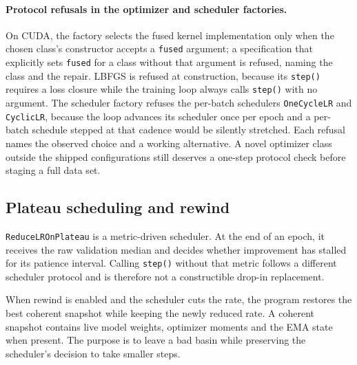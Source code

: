\documentclass[10pt,aps,prd,twocolumn,nofootinbib]{revtex4-2}
\newcommand{\code}[1]{\texttt{#1}}
\begin{document}
\paragraph{Protocol refusals in the optimizer and scheduler factories.}
On CUDA, the factory selects the fused kernel implementation only when the
chosen class's constructor accepts a \code{fused} argument; a specification
that explicitly sets \code{fused} for a class without that argument is
refused, naming the class and the repair.  LBFGS is refused at
construction, because its \code{step()} requires a loss closure while the
training loop always calls \code{step()} with no argument.  The scheduler
factory refuses the per-batch schedulers \code{OneCycleLR} and
\code{CyclicLR}, because the loop advances its scheduler once per epoch and
a per-batch schedule stepped at that cadence would be silently stretched.
Each refusal names the observed choice and a working alternative.  A novel
optimizer class outside the shipped configurations still deserves a
one-step protocol check before staging a full data set.

\subsection{Plateau scheduling and rewind}

\code{ReduceLROnPlateau} is a metric-driven scheduler.  At the end of an
epoch, it receives the raw validation median and decides whether improvement
has stalled for its patience interval.  Calling \code{step()} without that
metric follows a different scheduler protocol and is therefore not a
constructible drop-in replacement.

When rewind is enabled and the scheduler cuts the rate, the program restores
the best coherent snapshot while keeping the newly reduced rate.  A coherent
snapshot contains live model weights, optimizer moments and the EMA state
when present.  The purpose is to leave a bad basin while preserving the
scheduler's decision to take smaller steps.
\end{document}
